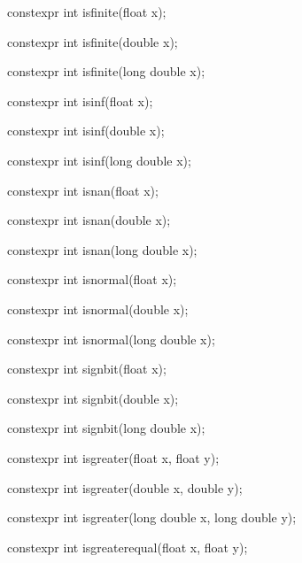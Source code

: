 \documentclass[prd,twocolumn,amsmath,amssymb,nofootinbib,eqsecnum]{revtex4-1}
\newcommand{\oldhighlight}[1]{{\color{green} #1}}
\begin{document}
{\oldhighlight{constexpr} int isfinite(float x);

\oldhighlight{constexpr} int isfinite(double x);

\oldhighlight{constexpr} int isfinite(long double x);

\vspace{2ex}


\oldhighlight{constexpr} int isinf(float x);

\oldhighlight{constexpr} int isinf(double x);

\oldhighlight{constexpr} int isinf(long double x);

\vspace{2ex}


\oldhighlight{constexpr} int isnan(float x);

\oldhighlight{constexpr} int isnan(double x);

\oldhighlight{constexpr} int isnan(long double x);

\vspace{2ex}


\oldhighlight{constexpr} int isnormal(float x);

\oldhighlight{constexpr} int isnormal(double x);

\oldhighlight{constexpr} int isnormal(long double x);

\vspace{2ex}


\oldhighlight{constexpr} int signbit(float x);

\oldhighlight{constexpr} int signbit(double x);

\oldhighlight{constexpr} int signbit(long double x);

\vspace{2ex}


\oldhighlight{constexpr} int isgreater(float x, float y);

\oldhighlight{constexpr} int isgreater(double x, double y);

\oldhighlight{constexpr} int isgreater(long double x, long double y);

\vspace{2ex}


\oldhighlight{constexpr} int isgreaterequal(float x, float y);

}
\end{document}

